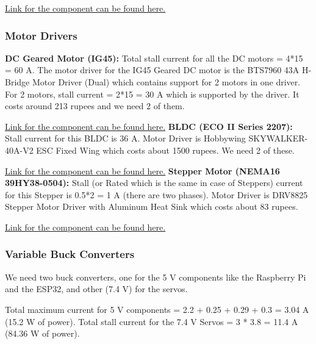 \documentclass[12pt]{article}
\begin{document}
\href{https://bmsdaly.com/collections/smart/products/daly-smart-bms-lfp-4s-7s-8s-16s-20s-24s-li-ion-3s-7s-13s-14s-16s-20s}{Link for the component can be found here.}

\subsubsection*{Motor Drivers}
\textbf{DC Geared Motor (IG45):}
Total stall current for all the DC motors = 4*15 = 60 A.
The motor driver for the IG45 Geared DC motor is the BTS7960 43A H-Bridge Motor Driver (Dual) which contains support for 2 motors in one driver. For 2 motors, stall current = 2*15 = 30 A which is supported by the driver. It costs around 213 rupees and we need 2 of them.

\href{https://www.thingbits.in/products/bts7960-43a-h-bridge-motor-driver?srsltid=AfmBOooXls3mIUkqAdGTjs5LBGZPjaQJos_ASP4EKz1j5q419vNpqofm}{Link for the component can be found here.}
\newline\newline
\textbf{BLDC (ECO II Series 2207):}
Stall current for this BLDC is 36 A. Motor Driver is Hobbywing SKYWALKER-40A-V2 ESC Fixed Wing which costs about 1500 rupees. We need 2 of these.

\href{https://robu.in/product/hobbywing-skywalker-40a-v2-esc-fixed-wing/?gad_source=1&gad_campaignid=17419548928&gbraid=0AAAAADvLFWeX4rkqn3LBCTpLUr-1jl0Tc&gclid=CjwKCAjw_pDBBhBMEiwAmY02NmetT8McrP0gYxQTB2tCx1UlfisPqtj8NFyWjIaiCMbyY6fJ9SDuFRoCG-0QAvD_BwE#tab-specification}{Link for the component can be found here.}
\newline\newline
\textbf{Stepper Motor (NEMA16 39HY38-0504):}
Stall (or Rated which is the same in case of Steppers) current for this Stepper is 0.5*2 = 1 A (there are two phases). Motor Driver is DRV8825 Stepper Motor Driver with Aluminum Heat Sink which costs about 83 rupees.

\href{https://robu.in/product/drv8825-stepper-motor-driver-with-aluminum-heat-sink/}{Link for the component can be found here.}

\subsubsection*{Variable Buck Converters}
We need two buck converters, one for the 5 V components like the Raspberry Pi and the ESP32, and other (7.4 V) for the servos.

Total maximum current for 5 V components = 2.2 + 0.25 + 0.29 + 0.3 = 3.04 A (15.2 W of power).
Total stall current for the 7.4 V Servos = 3 * 3.8 = 11.4 A (84.36 W of power).
\end{document}
